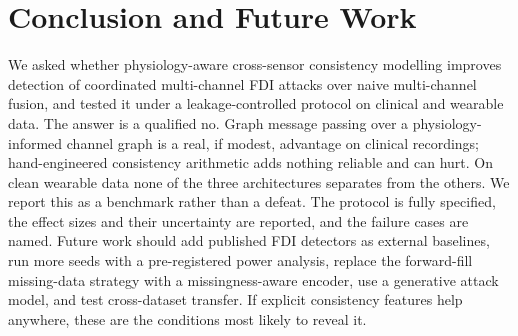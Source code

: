 \documentclass[conference]{IEEEtran}
\begin{document}
\section{Conclusion and Future Work}
We asked whether physiology-aware cross-sensor consistency modelling improves detection of coordinated multi-channel FDI attacks over naive multi-channel fusion, and tested it under a leakage-controlled protocol on clinical and wearable data. The answer is a qualified no. Graph message passing over a physiology-informed channel graph is a real, if modest, advantage on clinical recordings; hand-engineered consistency arithmetic adds nothing reliable and can hurt. On clean wearable data none of the three architectures separates from the others.
We report this as a benchmark rather than a defeat. The protocol is fully specified, the effect sizes and their uncertainty are reported, and the failure cases are named. Future work should add published FDI detectors as external baselines, run more seeds with a pre-registered power analysis, replace the forward-fill missing-data strategy with a missingness-aware encoder, use a generative attack model, and test cross-dataset transfer. If explicit consistency features help anywhere, these are the conditions most likely to reveal it.

\end{document}
